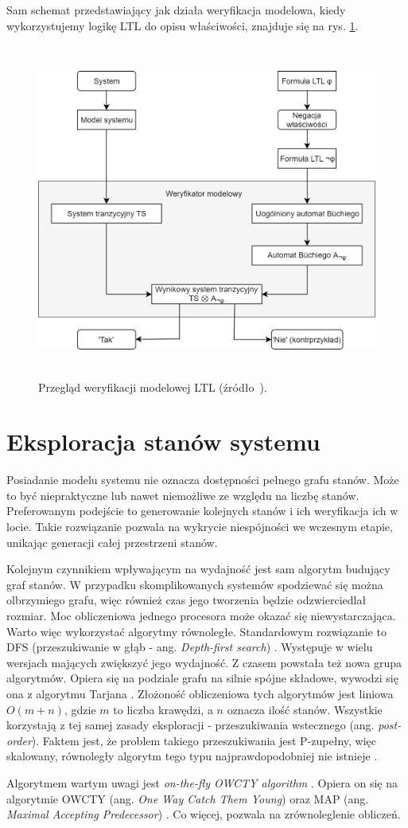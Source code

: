 Sam schemat przedstawiający jak działa weryfikacja modelowa, kiedy wykorzystujemy logikę LTL do opisu właściwości, znajduje się na rys. \ref{fig:ltl_model_checking}.

\begin{figure}[h]
    \centering
    \includegraphics[height=11cm,keepaspectratio]{img/ltl_model_checking_overview.png}
    \caption{Przegląd weryfikacji modelowej LTL (źródło~\cite{Bai08}).}
    \label{fig:ltl_model_checking}
\end{figure}


\section{Eksploracja stanów systemu}

Posiadanie modelu systemu nie oznacza dostępności pełnego grafu stanów.
Może to być niepraktyczne lub nawet niemożliwe ze względu na liczbę stanów.
Preferowanym podejście to generowanie kolejnych stanów i ich weryfikacja ich w locie.
Takie rozwiązanie pozwala na wykrycie niespójności we wczesnym etapie, unikając generacji całej przestrzeni stanów.

Kolejnym czynnikiem wpływającym na wydajność jest sam algorytm budujący graf stanów.
W przypadku skomplikowanych systemów spodziewać się można olbrzymiego grafu, więc również czas jego tworzenia będzie odzwierciedlał rozmiar.
Moc obliczeniowa jednego procesora może okazać się niewystarczająca.
Warto więc wykorzystać algorytmy równoległe.
Standardowym rozwiązanie to DFS (przeszukiwanie w głąb - ang. \textit{Depth-first search}) \cite{God94}\cite{Hol99}.
Występuje w wielu wersjach mających zwiększyć jego wydajność.
Z czasem powstała też nowa grupa algorytmów.
Opiera się na podziale grafu na silnie spójne składowe, wywodzi się ona z algorytmu Tarjana \cite{Jac05}.
Złożoność obliczeniowa tych algorytmów jest liniowa $O(m + n)$, gdzie $m$ to liczba krawędzi, a $n$ oznacza ilość stanów.
Wszystkie korzystają z tej samej zasady eksploracji - przeszukiwania wstecznego (ang. \textit{post-order}).
Faktem jest, że problem takiego przeszukiwania jest P-zupełny, więc skalowany, równoległy algorytm tego typu najprawdopodobniej nie istnieje \cite{Reif85}.

Algorytmem wartym uwagi jest \textit{on-the-fly OWCTY algorithm} \cite{Bar12}.
Opiera on się na algorytmie OWCTY (ang. \textit{One Way Catch Them Young}) \cite{Cer03} oraz MAP (ang. \textit{Maximal Accepting Predecessor}) \cite{Bri04}.
Co więcej, pozwala na zrównoleglenie obliczeń.
